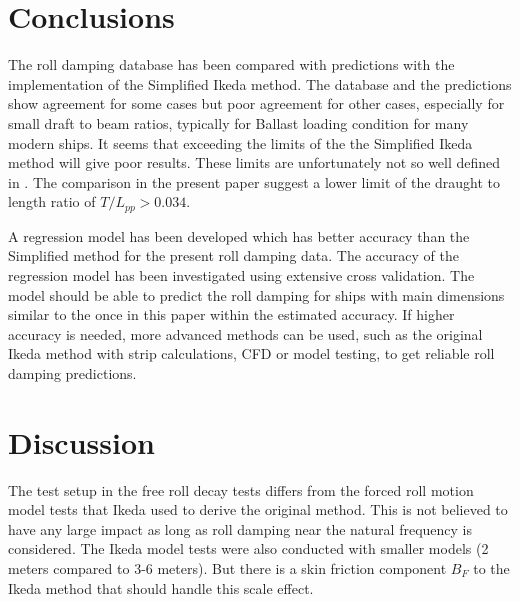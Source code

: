\section{Conclusions}
\label{se:conclusions}
The roll damping database has been compared with predictions with the implementation of the Simplified Ikeda method. The database and the predictions show agreement for some cases but poor agreement for other cases, especially for small draft to beam ratios, typically for Ballast loading condition for many modern ships. It seems that exceeding the limits of the the Simplified Ikeda method will give poor results. These limits are unfortunately not so well defined in \parencite{kawahara_simple_2011}. The comparison in the present paper suggest a lower limit of the draught to length ratio of $T/L_{pp}>0.034$.

A regression model has been developed which has better accuracy than the Simplified method for the present roll damping data. The accuracy of the regression model has been investigated using extensive cross validation. The model should be able to predict the roll damping for ships with main dimensions similar to the once in this paper within the estimated accuracy.
If higher accuracy is needed, more advanced methods can be used, such as the original Ikeda method with strip calculations, CFD or model testing, to get reliable roll damping predictions.

\section{Discussion}
The test setup in the free roll decay tests differs from the forced roll motion model tests that Ikeda \parencite{ikeda_velocity_1979} used to derive the original method. This is not believed to have any large impact as long as roll damping near the natural frequency is considered. The Ikeda model tests were also conducted with smaller models (2 meters compared to 3-6 meters). But there is a skin friction component $B_F$ to the Ikeda method that should handle this scale effect.

